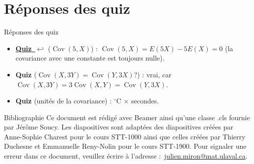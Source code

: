 \documentclass{BeamerTemplate}
\newcommand{\retour}[2]{\hyperlink{#1}{\textbf{#2}~{\color{gray}$\hookleftarrow$}}}
\newcommand{\Cov}{\operatorname{Cov}}
\begin{document}
\section{Réponses des quiz}

\begin{frame}[t,label=rep-quiz]{Réponses des quiz}
\footnotesize
\begin{itemize}\itemsep4pt
\item \retour{quizcov}{Quiz} ($\Cov(5,X)$) : $\Cov(5,X)=E(5X)-5E(X)=0$ (la covariance avec une constante est toujours nulle).
\item \textbf{Quiz} ($\Cov(X,3Y)=\Cov(Y,3X)$?) : vrai, car $\Cov(X,3Y)=3\Cov(X,Y)=\Cov(Y,3X)$.
\item \textbf{Quiz} (unités de la covariance) : $^\circ$C $\times$ secondes.
\end{itemize}
\end{frame}


\begin{frame}{Bibliographie}
 	Ce document est rédigé avec Beamer ainsi qu'une classe .cls fournie par Jérôme Soucy. Les diapositives sont adaptées des diapositives créées par Anne-Sophie Charest
 pour le cours STT-1000 ainsi que celles créées par Thierry Duchesne et Emmanuelle Reny-Nolin pour le cours STT-1900.
 	\printbibliography
 	\vfill
 	\footnotesize Pour signaler une erreur dans ce document, veuillez écrire à l'adresse :~\href{mailto:julien.miron@mat.ulaval.ca}{julien.miron@mat.ulaval.ca}.
 \end{frame}
\end{document}
